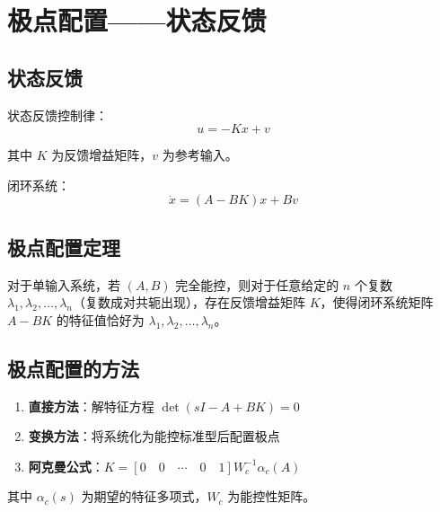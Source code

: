 \section{极点配置——状态反馈}

\subsection{状态反馈}
状态反馈控制律：
\[u = -Kx + v\]

其中 $K$ 为反馈增益矩阵，$v$ 为参考输入。

闭环系统：
\[\dot{x} = (A - BK)x + Bv\]

\subsection{极点配置定理}
对于单输入系统，若 $(A, B)$ 完全能控，则对于任意给定的 $n$ 个复数 $\lambda_1, \lambda_2, \ldots, \lambda_n$（复数成对共轭出现），存在反馈增益矩阵 $K$，使得闭环系统矩阵 $A - BK$ 的特征值恰好为 $\lambda_1, \lambda_2, \ldots, \lambda_n$。

\subsection{极点配置的方法}
\begin{enumerate}
    \item \textbf{直接方法}：解特征方程 $\det(sI - A + BK) = 0$
    \item \textbf{变换方法}：将系统化为能控标准型后配置极点
    \item \textbf{阿克曼公式}：$K = [0 \quad 0 \quad \cdots \quad 0 \quad 1] W_c^{-1} \alpha_c(A)$
\end{enumerate}

其中 $\alpha_c(s)$ 为期望的特征多项式，$W_c$ 为能控性矩阵。
